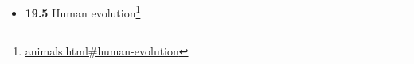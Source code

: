 \documentclass[
]{article}
\providecommand{\tightlist}{%
  \setlength{\itemsep}{0pt}\setlength{\parskip}{0pt}}
\providecommand{\tightlist}{%
  \setlength{\itemsep}{0pt}\setlength{\parskip}{0pt}}
\let\rmarkdownfootnote\footnote%
\def\footnote{\protect\rmarkdownfootnote}
\renewcommand{\href}[2]{#2\footnote{\url{#1}}}
\theoremstyle{definition}
\theoremstyle{definition}
\theoremstyle{definition}
\theoremstyle{remark}
\begin{document}
\begin{itemize}
\begin{itemize}
    \begin{itemize}
    \tightlist
    \item
      \href{animals.html\#epithelial-tissue}{\emph{}\textbf{19.4.1}
      Epithelial tissue}
    \item
      \href{animals.html\#connective-tissue}{\emph{}\textbf{19.4.2}
      Connective tissue}
    \item
      \href{animals.html\#muscular-tissue}{\emph{}\textbf{19.4.3}
      Muscular tissue}
    \item
      \href{animals.html\#nervous-tissue}{\emph{}\textbf{19.4.4} Nervous
      tissue}
    \item
      \href{animals.html\#the-integumentary-system}{\emph{}\textbf{19.4.5}
      The Integumentary System}
    \end{itemize}
  \item
    \href{animals.html\#human-evolution}{\emph{}\textbf{19.5} Human
    evolution}


\end{itemize}
\end{itemize}
\end{document}
